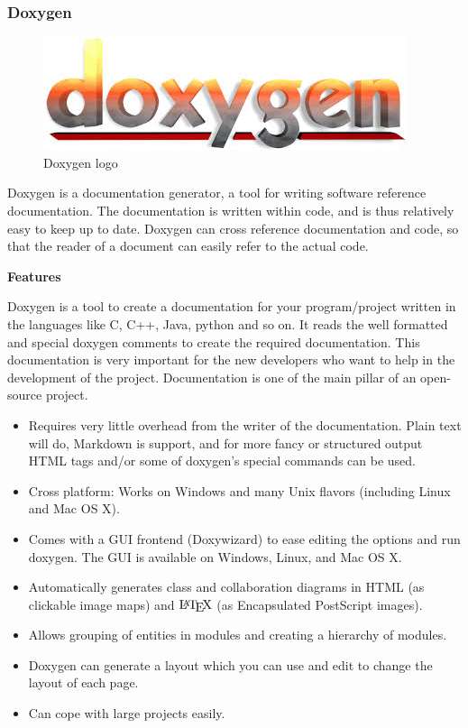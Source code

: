 \subsubsection{Doxygen}
\begin{figure}[ht]
\centering \includegraphics[scale=1]{input/images/doxygen.jpeg}
\caption{Doxygen logo}
\end{figure}
\noindent Doxygen is a documentation generator, a tool for writing software reference 
documentation. The documentation is written within code, and is thus 
relatively easy to keep up to date. Doxygen can cross reference 
documentation and code, so that the reader of a document can easily 
refer to the actual code.
\begin{center}
\textbf{Features}
\end{center}
Doxygen is a tool to create a documentation for your program/project written in the languages like C, C++, Java, python and so on. It reads the well formatted and special doxygen comments to create the required documentation. This documentation is very important for the new developers who want to help in the development of the project. Documentation is one of the main pillar of an open-source project.
\begin{itemize}
\item Requires very little overhead from the writer of the documentation. 
Plain text will do, Markdown is support, and for more fancy or structured 
output HTML tags and/or some of doxygen's special commands can be used.
\item Cross platform: Works on Windows and many Unix flavors (including 
Linux and Mac OS X).
\item Comes with a GUI frontend (Doxywizard) to ease editing the options 
and run doxygen. The GUI is available on Windows, Linux, and Mac OS X.
\item Automatically generates class and collaboration diagrams in HTML 
(as clickable image maps) and $\mbox{\LaTeX}$ (as Encapsulated PostScript 
images).
\item Allows grouping of entities in modules and creating a hierarchy 
of modules.
\item Doxygen can generate a layout which you can use and edit to change 
the layout of each page.
\item Can cope with large projects easily.
\end{itemize}
